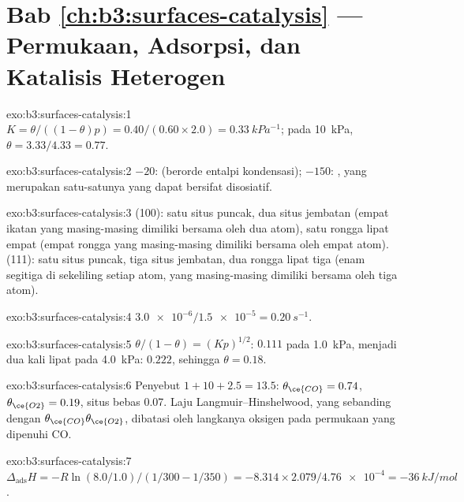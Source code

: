 \section*{Bab \ref{ch:b3:surfaces-catalysis} --- Permukaan, Adsorpsi, dan Katalisis Heterogen}

\begin{solution}{exo:b3:surfaces-catalysis:1}
$K = \theta/((1 - \theta)p) = 0.40/(0.60 \times 2.0) = \qty{0.33}{kPa^{-1}}$; pada \qty{10}{kPa}, $\theta = 3.33/4.33 = 0.77$.
\end{solution}

\begin{solution}{exo:b3:surfaces-catalysis:2}
$-20$:  (berorde entalpi kondensasi); $-150$: , yang
merupakan satu-satunya yang dapat bersifat disosiatif.
\end{solution}

\begin{solution}{exo:b3:surfaces-catalysis:3}
(100): satu situs puncak, dua situs jembatan (empat ikatan yang masing-masing
dimiliki bersama oleh dua atom), satu rongga lipat empat (empat rongga yang
masing-masing dimiliki bersama oleh empat atom). (111): satu situs puncak, tiga
situs jembatan, dua rongga lipat tiga (enam segitiga di sekeliling setiap
atom, yang masing-masing dimiliki bersama oleh tiga atom).
\end{solution}

\begin{solution}{exo:b3:surfaces-catalysis:4}
$\num{3.0e-6}/\num{1.5e-5} = \qty{0.20}{s^{-1}}$.
\end{solution}

\begin{solution}{exo:b3:surfaces-catalysis:5}
$\theta/(1 - \theta) = (Kp)^{1/2}$: $0.111$ pada \qty{1.0}{kPa}, menjadi dua kali lipat pada \qty{4.0}{kPa}: $0.222$, sehingga $\theta = 0.18$.
\end{solution}

\begin{solution}{exo:b3:surfaces-catalysis:6}
Penyebut $1 + 10 + 2.5 = 13.5$: $\theta_{\ce{CO}} = 0.74$, $\theta_{\ce{O2}} = 0.19$, situs bebas 0.07.
Laju Langmuir--Hinshelwood, yang sebanding dengan $\theta_{\ce{CO}}\theta_{\ce{O2}}$, dibatasi oleh
langkanya oksigen pada permukaan yang dipenuhi CO.
\end{solution}

\begin{solution}{exo:b3:surfaces-catalysis:7}
$\Delta_{\mathrm{ads}}H = -R\ln(8.0/1.0)/(1/300 - 1/350) = -8.314 \times 2.079/\num{4.76e-4} = \qty{-36}{kJ/mol}$.
\end{solution}

